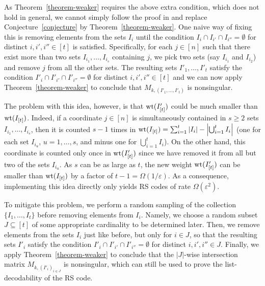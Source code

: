 \documentclass[11pt]{article}
\renewcommand{\epsilon}{\varepsilon}
\newcommand{\wt}{{\rm wt}}
\begin{document}
As Theorem~\ref{theorem-weaker} requires the above extra condition,  which does not hold in general, we cannot simply follow the proof in \cite{shangguan2019combinatorial0} and replace  Conjecture~\ref{conjecture} by Theorem~\ref{theorem-weaker}.
One naive way of fixing this  is removing elements from the sets $I_i$ until the condition $I_i\cap I_{i'}\cap I_{i''}=\emptyset$ for distinct $i,i',i''\in[t]$ is satisfied. Specifically, for each $j\in [n]$ such that there exist more than two sets $I_{i_1}, \dots, I_{i_s}$ containing $j$, we pick two sets (say $I_{i_1}$ and $I_{i_2}$) and remove $j$ from all the other sets. The resulting sets $I'_1,\dots,I'_t$ satisfy the condition $I'_i\cap I'_{i'}\cap I'_{i''}=\emptyset$ for distinct $i,i',i''\in[t]$ and we can now apply Theorem~\ref{theorem-weaker} to conclude that $M_{k,(I'_1,\ldots,I'_t)}$ is nonsingular.

The problem with this idea, however, is that  $\wt(I'_{[t]})$ could be much smaller than $\wt(I_{[t]})$.
Indeed, if a coordinate $j\in [n]$ is simultaneously contained in $s\geq 2$ sets $I_{i_1},\dots,I_{i_s}$, then it is counted $s-1$ times in   $\wt(I_{[t]})=\sum_{i=1}^t |I_i|-\left|\bigcup_{i=1}^t I_i\right|$ (one for each set $I_{i_u}$, $u=1,\dots,s$, and minus one for $\bigcup_{i=1}^t I_i$). On the other hand, this coordinate is counted only once in $\wt(I'_{[t]})$ since we have removed it from all but two of the sets $I_{i_u}$.
As $s$ can be as large as $t$, the new weight $\wt(I'_{[t]})$ can be smaller than $\wt(I_{[t]})$ by a factor of $t-1=\Omega(1/\epsilon)$.
As a consequence, implementing this idea directly only yields RS codes of rate $\Omega(\epsilon^2)$.

To mitigate this problem, we perform a random sampling of the collection $\{I_1,\dots,I_t\}$ before removing elements from $I_i$. Namely, we choose a random subset $J\subseteq [t]$ of some appropriate cardinality to be determined later.
Then,  we remove elements from the sets $I_i$ just like before, but only for $i\in J$, so that the resulting sets $I'_i$ satisfy the condition $I'_i\cap I'_{i'}\cap I'_{i''}=\emptyset$ for distinct $i,i',i''\in J$.
Finally, we apply Theorem~\ref{theorem-weaker} to conclude that  the $|J|$-wise intersection matrix $M_{k,(I'_i)_{i\in J}}$ is nonsingular, which can still be used to prove the list-decodability of the RS code.
\end{document}

